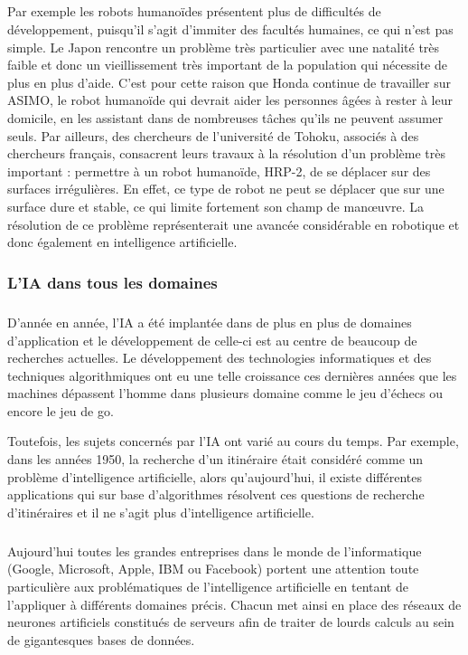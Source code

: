 \subparagraph{}
Par exemple les robots humanoïdes présentent plus de difficultés de développement, puisqu’il s’agit d’immiter des facultés humaines, ce qui n’est pas simple. Le Japon rencontre un problème très particulier avec une natalité très faible et donc un vieillissement très important de la population qui nécessite de plus en plus d’aide. C’est pour cette raison que Honda continue de travailler sur ASIMO, le robot humanoïde qui devrait aider les personnes âgées à rester à leur domicile, en les assistant dans de nombreuses tâches qu’ils ne peuvent assumer seuls. Par ailleurs, des chercheurs de l’université de Tohoku, associés à des chercheurs français, consacrent leurs travaux à la résolution d’un problème très important : permettre à un robot humanoïde, HRP-2, de se déplacer sur des surfaces irrégulières. En effet, ce type de robot ne peut se déplacer que sur une surface dure et stable, ce qui limite fortement son champ de manœuvre. La résolution de ce problème représenterait une avancée considérable en robotique et donc également en intelligence artificielle.


\subsubsection{L'IA dans tous les domaines}
\subparagraph{}
D’année en année, l'IA a été implantée dans de plus en plus de domaines d'application et le développement de celle-ci est au centre de beaucoup de recherches actuelles. 
Le développement des technologies informatiques et des techniques algorithmiques ont eu une telle croissance ces dernières années que les machines dépassent l’homme dans plusieurs domaine comme le jeu d’échecs ou encore le jeu de go.

Toutefois, les sujets concernés par l’IA ont varié au cours du temps. Par exemple, dans les années 1950, la recherche d'un itinéraire était considéré comme un problème d'intelligence artificielle, alors qu’aujourd’hui, il existe différentes applications qui sur base d’algorithmes résolvent ces questions de recherche d'itinéraires et il ne s’agit plus d’intelligence artificielle.

\subparagraph{}
Aujourd’hui toutes les grandes entreprises dans le monde de l’informatique (Google, Microsoft, Apple, IBM ou Facebook) portent une attention toute particulière aux problématiques de l'intelligence artificielle en tentant de l'appliquer à différents domaines précis. 
Chacun met ainsi en place des réseaux de neurones artificiels constitués de serveurs afin de traiter de lourds calculs au sein de gigantesques bases de données.

